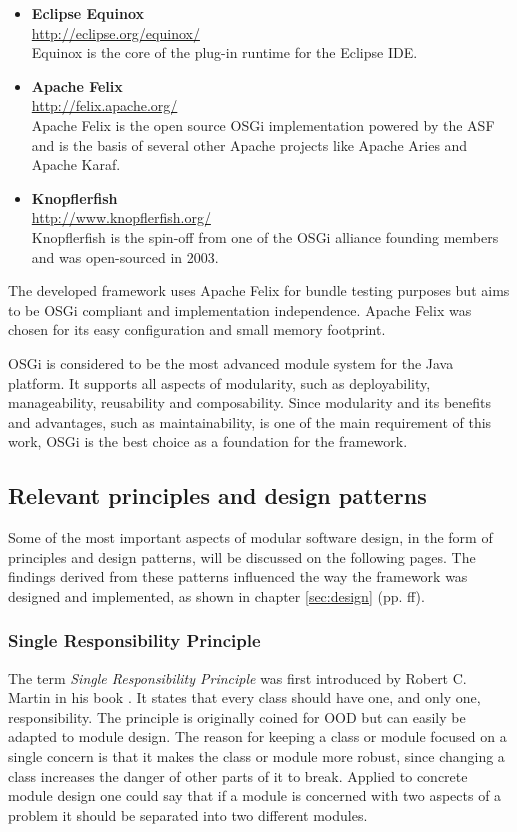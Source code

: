 \begin{itemize}
	\item \textbf{Eclipse Equinox} \\
		\url{http://eclipse.org/equinox/} \\
		Equinox is the core of the plug-in runtime for the Eclipse IDE.
	\item \textbf{Apache Felix} \\
		\url{http://felix.apache.org/} \\
		Apache Felix is the open source \gls{OSGi} implementation powered by the \gls{ASF} and is the basis of several other Apache projects like Apache Aries and Apache Karaf.
	\item \textbf{Knopflerfish} \\
		\url{http://www.knopflerfish.org/} \\
		Knopflerfish is the spin-off from one of the \gls{OSGi} alliance founding members and was open-sourced in 2003.
\end{itemize}

The developed framework uses Apache Felix for bundle testing purposes but aims to be \gls{OSGi} compliant and implementation independence. Apache Felix was chosen for its easy configuration and small memory footprint.

\gls{OSGi} is considered to be the most advanced module system for the Java platform. It supports all aspects of modularity, such as deployability, manageability, reusability and composability. Since modularity and its benefits and advantages, such as maintainability, is one of the main requirement of this work, \gls{OSGi} is the best choice as a foundation for the framework. 

\subsection{Relevant principles and design patterns}
\label{sec:patterns}
Some of the most important aspects of modular software design, in the form of principles and design patterns, will be discussed on the following pages. The findings derived from these patterns influenced the way the framework was designed and implemented, as shown in chapter \ref{sec:design} (pp. \pageref{sec:design}ff).

\subsubsection{Single Responsibility Principle}
The term \textit{Single Responsibility Principle} was first introduced by Robert C. Martin in his book  \cite{Martin:2002}. It states that every class should have one, and only one, responsibility. The principle is originally coined for \gls{OOD} but can easily be adapted to module design. The reason for keeping a class or module focused on a single concern is that it makes the class or module more robust, since changing a class increases the danger of other parts of it to break. Applied to concrete module design one could say that if a module is concerned with two aspects of a problem it should be separated into two different modules. 

